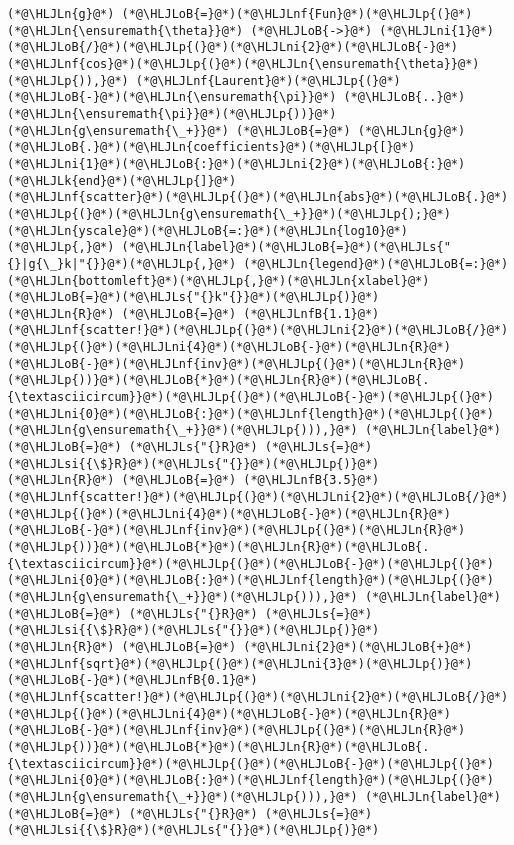 \documentclass[12pt,landscape]{article}
\newcommand{\HLJLk}[1]{\textcolor[RGB]{148,91,176}{\textbf{#1}}}
\newcommand{\HLJLn}[1]{#1}
\newcommand{\HLJLnf}[1]{\textcolor[RGB]{66,102,213}{#1}}
\newcommand{\HLJLs}[1]{\textcolor[RGB]{201,61,57}{#1}}
\newcommand{\HLJLsi}[1]{#1}
\newcommand{\HLJLnfB}[1]{\textcolor[RGB]{59,151,46}{#1}}
\newcommand{\HLJLni}[1]{\textcolor[RGB]{59,151,46}{#1}}
\newcommand{\HLJLoB}[1]{\textcolor[RGB]{102,102,102}{\textbf{#1}}}
\newcommand{\HLJLp}[1]{#1}
\begin{document}
{\begin{lstlisting}
(*@\HLJLn{g}@*) (*@\HLJLoB{=}@*)(*@\HLJLnf{Fun}@*)(*@\HLJLp{(}@*)(*@\HLJLn{\ensuremath{\theta}}@*) (*@\HLJLoB{->}@*) (*@\HLJLni{1}@*)(*@\HLJLoB{/}@*)(*@\HLJLp{(}@*)(*@\HLJLni{2}@*)(*@\HLJLoB{-}@*)(*@\HLJLnf{cos}@*)(*@\HLJLp{(}@*)(*@\HLJLn{\ensuremath{\theta}}@*)(*@\HLJLp{)),}@*) (*@\HLJLnf{Laurent}@*)(*@\HLJLp{(}@*)(*@\HLJLoB{-}@*)(*@\HLJLn{\ensuremath{\pi}}@*) (*@\HLJLoB{..}@*) (*@\HLJLn{\ensuremath{\pi}}@*)(*@\HLJLp{))}@*)
(*@\HLJLn{g\ensuremath{\_+}}@*) (*@\HLJLoB{=}@*) (*@\HLJLn{g}@*)(*@\HLJLoB{.}@*)(*@\HLJLn{coefficients}@*)(*@\HLJLp{[}@*)(*@\HLJLni{1}@*)(*@\HLJLoB{:}@*)(*@\HLJLni{2}@*)(*@\HLJLoB{:}@*)(*@\HLJLk{end}@*)(*@\HLJLp{]}@*)
(*@\HLJLnf{scatter}@*)(*@\HLJLp{(}@*)(*@\HLJLn{abs}@*)(*@\HLJLoB{.}@*)(*@\HLJLp{(}@*)(*@\HLJLn{g\ensuremath{\_+}}@*)(*@\HLJLp{);}@*) (*@\HLJLn{yscale}@*)(*@\HLJLoB{=:}@*)(*@\HLJLn{log10}@*)(*@\HLJLp{,}@*) (*@\HLJLn{label}@*)(*@\HLJLoB{=}@*)(*@\HLJLs{"{}|g{\_}k|"{}}@*)(*@\HLJLp{,}@*) (*@\HLJLn{legend}@*)(*@\HLJLoB{=:}@*)(*@\HLJLn{bottomleft}@*)(*@\HLJLp{,}@*)(*@\HLJLn{xlabel}@*)(*@\HLJLoB{=}@*)(*@\HLJLs{"{}k"{}}@*)(*@\HLJLp{)}@*)
(*@\HLJLn{R}@*) (*@\HLJLoB{=}@*) (*@\HLJLnfB{1.1}@*)
(*@\HLJLnf{scatter!}@*)(*@\HLJLp{(}@*)(*@\HLJLni{2}@*)(*@\HLJLoB{/}@*)(*@\HLJLp{(}@*)(*@\HLJLni{4}@*)(*@\HLJLoB{-}@*)(*@\HLJLn{R}@*)(*@\HLJLoB{-}@*)(*@\HLJLnf{inv}@*)(*@\HLJLp{(}@*)(*@\HLJLn{R}@*)(*@\HLJLp{))}@*)(*@\HLJLoB{*}@*)(*@\HLJLn{R}@*)(*@\HLJLoB{.{\textasciicircum}}@*)(*@\HLJLp{(}@*)(*@\HLJLoB{-}@*)(*@\HLJLp{(}@*)(*@\HLJLni{0}@*)(*@\HLJLoB{:}@*)(*@\HLJLnf{length}@*)(*@\HLJLp{(}@*)(*@\HLJLn{g\ensuremath{\_+}}@*)(*@\HLJLp{))),}@*) (*@\HLJLn{label}@*) (*@\HLJLoB{=}@*) (*@\HLJLs{"{}R}@*) (*@\HLJLs{=}@*) (*@\HLJLsi{{\$}R}@*)(*@\HLJLs{"{}}@*)(*@\HLJLp{)}@*)
(*@\HLJLn{R}@*) (*@\HLJLoB{=}@*) (*@\HLJLnfB{3.5}@*)
(*@\HLJLnf{scatter!}@*)(*@\HLJLp{(}@*)(*@\HLJLni{2}@*)(*@\HLJLoB{/}@*)(*@\HLJLp{(}@*)(*@\HLJLni{4}@*)(*@\HLJLoB{-}@*)(*@\HLJLn{R}@*)(*@\HLJLoB{-}@*)(*@\HLJLnf{inv}@*)(*@\HLJLp{(}@*)(*@\HLJLn{R}@*)(*@\HLJLp{))}@*)(*@\HLJLoB{*}@*)(*@\HLJLn{R}@*)(*@\HLJLoB{.{\textasciicircum}}@*)(*@\HLJLp{(}@*)(*@\HLJLoB{-}@*)(*@\HLJLp{(}@*)(*@\HLJLni{0}@*)(*@\HLJLoB{:}@*)(*@\HLJLnf{length}@*)(*@\HLJLp{(}@*)(*@\HLJLn{g\ensuremath{\_+}}@*)(*@\HLJLp{))),}@*) (*@\HLJLn{label}@*) (*@\HLJLoB{=}@*) (*@\HLJLs{"{}R}@*) (*@\HLJLs{=}@*) (*@\HLJLsi{{\$}R}@*)(*@\HLJLs{"{}}@*)(*@\HLJLp{)}@*)
(*@\HLJLn{R}@*) (*@\HLJLoB{=}@*) (*@\HLJLni{2}@*)(*@\HLJLoB{+}@*)(*@\HLJLnf{sqrt}@*)(*@\HLJLp{(}@*)(*@\HLJLni{3}@*)(*@\HLJLp{)}@*)(*@\HLJLoB{-}@*)(*@\HLJLnfB{0.1}@*)
(*@\HLJLnf{scatter!}@*)(*@\HLJLp{(}@*)(*@\HLJLni{2}@*)(*@\HLJLoB{/}@*)(*@\HLJLp{(}@*)(*@\HLJLni{4}@*)(*@\HLJLoB{-}@*)(*@\HLJLn{R}@*)(*@\HLJLoB{-}@*)(*@\HLJLnf{inv}@*)(*@\HLJLp{(}@*)(*@\HLJLn{R}@*)(*@\HLJLp{))}@*)(*@\HLJLoB{*}@*)(*@\HLJLn{R}@*)(*@\HLJLoB{.{\textasciicircum}}@*)(*@\HLJLp{(}@*)(*@\HLJLoB{-}@*)(*@\HLJLp{(}@*)(*@\HLJLni{0}@*)(*@\HLJLoB{:}@*)(*@\HLJLnf{length}@*)(*@\HLJLp{(}@*)(*@\HLJLn{g\ensuremath{\_+}}@*)(*@\HLJLp{))),}@*) (*@\HLJLn{label}@*) (*@\HLJLoB{=}@*) (*@\HLJLs{"{}R}@*) (*@\HLJLs{=}@*) (*@\HLJLsi{{\$}R}@*)(*@\HLJLs{"{}}@*)(*@\HLJLp{)}@*)
\end{lstlisting}

}
\end{document}
